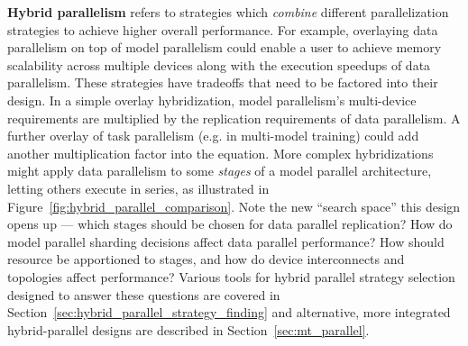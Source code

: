 \textbf{Hybrid parallelism} refers to strategies which \textit{combine} different parallelization strategies to achieve higher overall performance. For example, overlaying data parallelism on top of model parallelism could enable a user to achieve memory scalability across multiple devices along with the execution speedups of data parallelism. These strategies have tradeoffs that need to be factored into their design. In a simple overlay hybridization, model parallelism's multi-device requirements are multiplied by the replication requirements of data parallelism. A further overlay of task parallelism (e.g. in multi-model training) could add another multiplication factor into the equation. More complex hybridizations might apply data parallelism to some \textit{stages} of a model parallel architecture, letting others execute in series, as illustrated in Figure~\ref{fig:hybrid_parallel_comparison}. Note the new ``search space'' this design opens up --- which stages should be chosen for data parallel replication? How do model parallel sharding decisions affect data parallel performance? How should resource be apportioned to stages, and how do device interconnects and topologies affect performance? Various tools for hybrid parallel strategy selection designed to answer these questions are covered in Section~\ref{sec:hybrid_parallel_strategy_finding} and alternative, more integrated hybrid-parallel designs are described in Section~\ref{sec:mt_parallel}.

